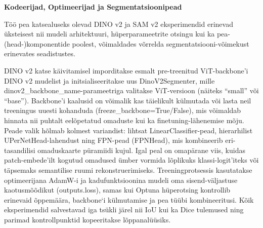 \textbf{Kodeerijad, Optimeerijad ja Segmentatsioonipead}

Töö pea katsealuseks olevad DINO v2 ja SAM v2 eksperimendid erinevad üksteisest nii mudeli
arhitektuuri, hüperparameetrite otsingu kui ka pea-(head-)komponentide poolest,
võimaldades võrrelda segmentatsiooni-võimekust erinevates seadistustes.

DINO v2 katse käivitamisel imporditakse esmalt pre-treenitud ViT-backbone'i
DINO v2 mudelist ja initsialiseeritakse uus DinoV2Segmenter, mille
dinov2\_backbone\_name-parameetriga valitakse ViT-versioon (näiteks ``small''
või ``base''). Backbone'i kaalusid on võimalik kas täielikult külmutada või
lasta neil treeningus uuesti kohanduda (freeze\_backbone=True/False), mis
võimaldab hinnata nii puhtalt eelõpetatud omaduste kui ka finetuning-lähenemise
mõju. Peade valik hõlmab kolmest variandist: lihtsat LinearClassifier-pead,
hierarhilist UPerNetHead-lahendust ning FPN-pead (FPNHead), mis kombineerib
eri-tasandilisi omaduskaarte püramiidi kujul. Igal peal on omapärane viis,
kuidas patch-embede'ilt kogutud omadused ümber vormida lõplikuks
klassi-logit'iteks või täpsemaks semantilise ruumi rekonstruerimiseks.
Treeningprotsessis kasutatakse optimeerijana AdamW-i ja kadufunktsioonina mudeli
oma sisend-väljastuse kaotusmõõdikut (outputs.loss), samas kui Optuna
hüperotsing kontrollib erinevaid õppemäära, backbone`i külmutamise ja pea tüübi
kombineeritusi. Kõik eksperimendid salvestavad iga tsükli järel nii IoU kui ka
Dice tulemused ning parimad kontrollpunktid kopeeritakse lõppanalüüsiks.
\bigskip

